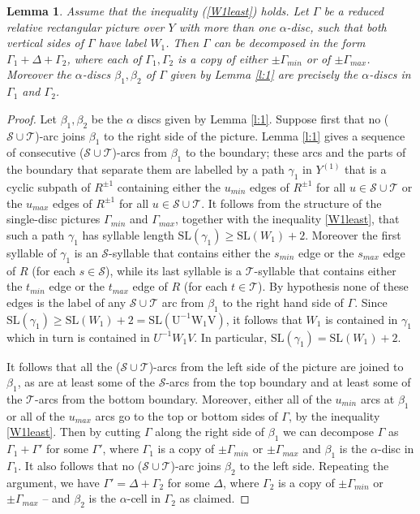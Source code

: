 \documentclass[12pt,a4paper]{amsart}
\def\G{\Gamma}
\def\D{\Delta}
\def\a{\alpha}
\def\b{\beta}
\def\g{\gamma}
\def\cS{\mathcal{S}}
\def\cT{\mathcal{T}}
\newtheorem{lem}[thm]{Lemma}
\begin{document}
\begin{lem}\label{l:2}
	Assume that the inequality (\ref{W1least}) holds.
	Let $\G$ be a reduced relative rectangular  picture 
	over $Y$ with more than one $\a$-disc, 
	such that both vertical sides of $\G$ have label $W_1$.    
	Then $\G$ can be decomposed in the form $\G_1+\Delta+\G_2$, 
	where each of $\G_1,\G_2$ is a copy of either  $\pm\G_{min}$ or of $\pm\G_{max}$. 
	Moreover the $\a$-discs $\b_1,\b_2$ of $\G$ given by Lemma \ref{l:1}
	are precisely the $\a$-discs in $\G_1$ and $\G_2$.
	
\end{lem}

\begin{proof} Let $\b_1,\b_2$ be the $\a$ discs given by Lemma \ref{l:1}.
	Suppose first that no ($\cS\cup\cT$)-arc joins $\b_1$ to the right side of the picture.  Lemma \ref{l:1} gives a sequence of consecutive ($\cS\cup\cT$)-arcs from $\b_1$ to the boundary; these arcs and the parts of the boundary that separate them are labelled by a path $\g_1$ in $Y^{(1)}$ that is a cyclic subpath  of $R^{\pm1}$ containing either the $u_{min}$ edges of $R^{\pm1}$ for all $u\in\cS\cup\cT$ or the $u_{max}$ edges of $R^{\pm1}$ for all $u\in\cS\cup\cT$. It follows from the structure of the single-disc pictures $\G_{min}$ and $\G_{max}$, together with the inequality \eqref{W1least}, that such a path $\g_1$ has  syllable length $\mathrm{SL}(\g_1)\ge\text{SL}(W_1)+2$.  Moreover the first syllable of $\g_1$ is an $\cS$-syllable that contains either the $s_{min}$ edge or the $s_{max}$ edge of $R$ (for each $s\in\cS$), while its last syllable is a $\cT$-syllable that contains either the $t_{min}$ edge or the $t_{max}$ edge of $R$ (for each $t\in\cT$).
		By hypothesis none of these edges is the label of any $\cS\cup\cT$ arc from $\b_1$ to the right hand side of $\G$.   Since $\mathrm{SL}(\g_1)\ge \mathrm{SL}(W_1)+2=\mathrm{SL(U^{-1}W_1V)}$, it follows that $W_1$ is contained in $\g_1$ which in turn is contained in $U^{-1}W_1V$. In particular, $\text{SL}(\g_1)=\text{SL}(W_1)+2$.
	
	It follows that all the ($\cS\cup\cT$)-arcs from the left side of the picture are joined to $\b_1$, as are at least some of the $\cS$-arcs from the top boundary and at least some of the $\cT$-arcs from the bottom boundary. 
	Moreover, either all of the $u_{min}$ arcs at $\b_1$ or all of the $u_{max}$ arcs go to the top or bottom sides of $\G$, by the inequality \eqref{W1least}.     
	Then by cutting $\G$ along the right side of $\b_1$ we can decompose $\G$ as $\G_1+\G'$ for some $\G'$, where  $\G_1$ is a copy of $\pm\G_{min}$ or $\pm\G_{max}$ and $\b_1$ is the $\a$-disc in $\G_1$. 
	It also follows that no ($\cS\cup\cT$)-arc joins $\b_2$ to the left side. 
	Repeating the argument, we have $\G'=\Delta+\G_2$ for some $\D$, where $\G_2$ is a copy of $\pm\G_{min}$ or $\pm\G_{max}$ 
	-- and $\b_2$ is the $\a$-cell in  $\G_2$ as claimed. 
	

\end{proof}
\end{document}
